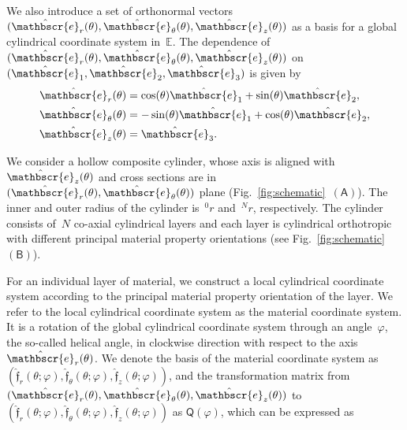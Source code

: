 \documentclass[preprint,10pt,times]{elsarticle}
\numberwithin{equation}{section}
\newcommand{\physe}{\hat{\mathbscr{e}}} %
\newcommand{\physf}{\hat{\boldsymbol{\mathfrak{f}}}}
\renewcommand{\u}[1]{\boldsymbol{#1}}
\newcommand{\usf}[1]{\u{\mathsf #1}}
\newcommand{\pr}[1]{\left( #1 \right)}
\newcommand{\subf}[1]{\pr{\textsf{#1}}}
\renewcommand{\>}{$\Rightarrow$}
\begin{document}
We also introduce a set of orthonormal vectors~$(\physe_{r}(\theta),\physe_{\theta}(\theta),\physe_{z}(\theta))$ as a basis for a global cylindrical coordinate system in~$\mathbb{E}$. The dependence of~$(\physe_{r}(\theta),\physe_{\theta}(\theta),\physe_{z}(\theta))$ on~$(\physe_1,\physe_2,\physe_3)$ is given by
\begin{subequations}
\begin{align}
\physe_{r}(\theta) & = \cos(\theta) \physe_1 + \sin(\theta) \physe_2 , \\
\physe_{\theta}(\theta) & = -\sin(\theta) \physe_1 + \cos(\theta) \physe_2 , \\
\physe_{z} (\theta) & =  \physe_3.
\end{align}
\end{subequations}

We consider a hollow composite cylinder, whose axis is aligned with~$\physe_{z}(\theta)$ and cross sections are in~$(\physe_{r}(\theta),\physe_{\theta}(\theta))$ plane (Fig.~\ref{fig:schematic}~$\subf{A}$).
The inner and outer radius of the cylinder is~${}^{0}\!{r}$ and~${}^{N}\!{r}$, respectively.
The cylinder consists of~$N$ co-axial cylindrical layers and each layer is cylindrical orthotropic with different principal material property orientations (see Fig.~\ref{fig:schematic}~$\subf{B}$).

For an individual layer of material, we construct a local cylindrical coordinate system according to the principal material property orientation of the layer. We refer to the local cylindrical coordinate system as the material coordinate system. It is a rotation of the global cylindrical coordinate system through an angle~$\varphi$, the so-called helical angle, in clockwise direction with respect to the axis~$\physe_{r}(\theta)$.
We denote the basis of the material coordinate system as~$(\physf_{r}(\theta;\varphi),\physf_{\theta}(\theta;\varphi),\physf_{z}(\theta;\varphi))$, 
and the transformation matrix from~$(\physe_{r}(\theta),\physe_{\theta}(\theta),\physe_{z}(\theta))$ to~$(\physf_{r}(\theta;\varphi),\physf_{\theta}(\theta;\varphi),\physf_{z}(\theta;\varphi))$ as $\usf{Q}(\varphi)$, which can be expressed as
\end{document}
